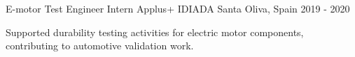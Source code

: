 \cventry
  {E-motor Test Engineer Intern}
  {Applus+ IDIADA}
  {Santa Oliva, Spain}
  {2019 - 2020}
  {
    \begin{cvitems}
      \item {Supported durability testing activities for electric motor components, contributing to automotive validation work.}
    \end{cvitems}
  }
